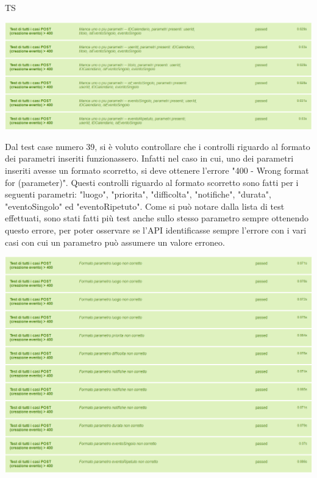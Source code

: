 \begin{listaPersonale}{TS}
\begin{center}
                        \includegraphics[width=1\textwidth, height=0.25\textheight]{img/png/tests/EventoPost/400_missingParameter_PostEvento.png}
                \end{center}
                Dal test case numero 39, si è voluto controllare che i controlli riguardo al formato dei parametri inseriti funzionassero. Infatti nel caso in cui, uno dei parametri inseriti avesse un formato scorretto, si deve ottenere l'errore "400 - Wrong format for (parameter)". Questi controlli riguardo al formato scorretto sono fatti per i seguenti parametri: "luogo", "priorita", "difficolta", "notifiche", "durata", "eventoSingolo" ed "eventoRipetuto". Come si può notare dalla lista di test effettuati, sono stati fatti più test anche sullo stesso parametro sempre ottenendo questo errore, per poter osservare se l'API identificasse sempre l'errore con i vari casi con cui un parametro può assumere un valore erroneo.\\
                \begin{center}
                        \includegraphics[width=1\textwidth, height=0.45\textheight]{img/png/tests/EventoPost/400_wrongFormat_PostEvento.png}

\end{center}
\end{listaPersonale}
